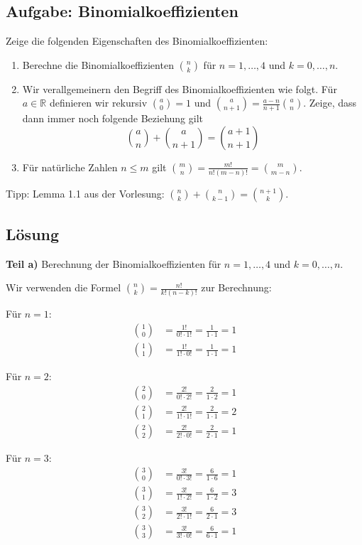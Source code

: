 \documentclass{article}
\begin{document}
\subsection*{Aufgabe: Binomialkoeffizienten}
Zeige die folgenden Eigenschaften des Binomialkoeffizienten:
\begin{enumerate}
\item Berechne die Binomialkoeffizienten $\binom{n}{k}$ für $n = 1, \dots, 4$ und $k = 0, \dots ,n$.
\item Wir verallgemeinern den Begriff des Binomialkoeffizienten wie folgt. Für
  $a \in \mathbb{R}$ definieren wir rekursiv $\binom{a}{0} = 1$ und $\binom{a}{n + 1}
  = \frac{a - n}{n + 1} \binom{a}{n}$. Zeige, dass dann immer noch folgende
  Beziehung gilt
  \[
    \binom{a}{n} + \binom{a}{n + 1}
    =
    \binom{a + 1}{n + 1}
  \]
  \item Für natürliche Zahlen $n \leq m$ gilt $\binom{m}{n} = \frac{m!}{n! (m
      - n)!} = \binom{m}{m - n}$.
\end{enumerate}
Tipp: Lemma 1.1 aus der Vorlesung: $\binom{n}{k} + \binom{n}{k-1} = \binom{n+1}{k}$.

\subsection*{Lösung}

\textbf{Teil a)} Berechnung der Binomialkoeffizienten für $n = 1, \dots, 4$ und $k = 0, \dots ,n$.

Wir verwenden die Formel $\binom{n}{k} = \frac{n!}{k!(n-k)!}$ zur Berechnung:

Für $n = 1$:
\begin{align}
\binom{1}{0} &= \frac{1!}{0! \cdot 1!} = \frac{1}{1 \cdot 1} = 1 \\
\binom{1}{1} &= \frac{1!}{1! \cdot 0!} = \frac{1}{1 \cdot 1} = 1
\end{align}

Für $n = 2$:
\begin{align}
\binom{2}{0} &= \frac{2!}{0! \cdot 2!} = \frac{2}{1 \cdot 2} = 1 \\
\binom{2}{1} &= \frac{2!}{1! \cdot 1!} = \frac{2}{1 \cdot 1} = 2 \\
\binom{2}{2} &= \frac{2!}{2! \cdot 0!} = \frac{2}{2 \cdot 1} = 1
\end{align}

Für $n = 3$:
\begin{align}
\binom{3}{0} &= \frac{3!}{0! \cdot 3!} = \frac{6}{1 \cdot 6} = 1 \\
\binom{3}{1} &= \frac{3!}{1! \cdot 2!} = \frac{6}{1 \cdot 2} = 3 \\
\binom{3}{2} &= \frac{3!}{2! \cdot 1!} = \frac{6}{2 \cdot 1} = 3 \\
\binom{3}{3} &= \frac{3!}{3! \cdot 0!} = \frac{6}{6 \cdot 1} = 1
\end{align}
\end{document}
